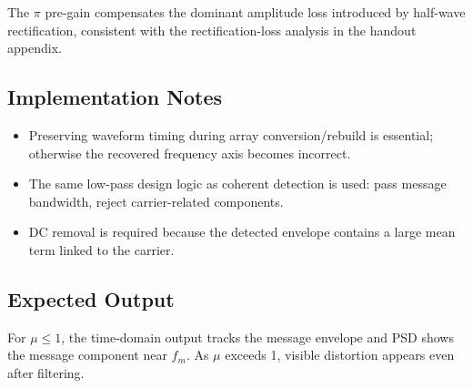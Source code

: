 The $\pi$ pre-gain compensates the dominant amplitude loss introduced by half-wave rectification, consistent with the rectification-loss analysis in the handout appendix.

\subsection*{Implementation Notes}
\begin{itemize}
\item Preserving waveform timing during array conversion/rebuild is essential; otherwise the recovered frequency axis becomes incorrect.
\item The same low-pass design logic as coherent detection is used: pass message bandwidth, reject carrier-related components.
\item DC removal is required because the detected envelope contains a large mean term linked to the carrier.
\end{itemize}

\subsection*{Expected Output}
For $\mu \le 1$, the time-domain output tracks the message envelope and PSD shows the message component near $f_m$. As $\mu$ exceeds 1, visible distortion appears even after filtering.
